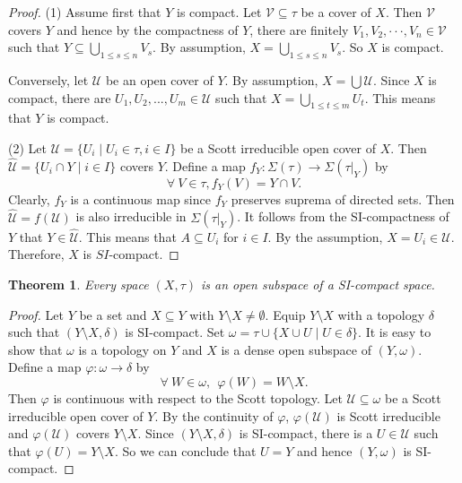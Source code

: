 \documentclass[preprint,12pt]{elsarticle}
\numberwithin{equation}{section}
\newtheorem{theorem}{Theorem}[section]
\begin{document}
\begin{proof}(1) Assume first that $Y$ is compact. Let $\mathcal{V}\subseteq\tau$ be a cover of $X$. Then $\mathcal{V}$ covers $Y$ and hence by the compactness of $Y$, there are finitely $V_{1},V_{2},\cdot\cdot\cdot, V_{n}\in\mathcal{V}$ such that $Y\subseteq\bigcup\limits_{1\leq s\leq n} V_{s}$. By assumption, $X=\bigcup\limits_{1\leq s\leq n} V_{s}$. So $X$ is compact.

Conversely, let $\mathcal{U}$ be an open cover of $Y$. By assumption, $X=\bigcup\mathcal{U}$. Since $X$ is compact, there are $U_{1},U_{2},...,U_{m}\in\mathcal{U}$ such that $X=\bigcup\limits_{1\leq t\leq m}U_{t}$. This means that $Y$ is compact.

(2) Let $\mathcal{U}=\{U_{i}\mid U_{i}\in\tau, i\in I\}$ be a Scott irreducible open cover of $X$. Then $\hat{\mathcal{U}}=\{U_{i}\cap Y\mid i\in I\}$ covers $Y$.  Define a map $f_{Y}:\Sigma(\tau)\longrightarrow\Sigma(\tau|_{Y})$ by
$$\forall\ V\in\tau, f_{Y}(V)=Y\cap V.$$
Clearly, $f_{Y}$ is a continuous map since $f_{Y}$ preserves suprema of directed sets. Then $\hat{\mathcal{U}}=f(\mathcal{U})$ is also irreducible in $\Sigma(\tau|_{Y})$. It follows from the SI-compactness of $Y$ that $Y\in\hat{\mathcal{U}}$. This means that $A\subseteq U_{i}$ for $i\in I$. By the assumption, $X=U_{i}\in\mathcal{U}$. Therefore, $X$ is $SI$-compact.\end{proof}



\begin{theorem} Every space $(X,\tau)$ is an open subspace of a SI-compact space.
\end{theorem}
\begin{proof}Let $Y$ be a set and $X\subseteq Y$ with $Y\setminus X\neq\emptyset$. Equip $Y\setminus X$ with a topology $\delta$ such that $(Y\setminus X,\delta)$ is SI-compact. Set $\omega=\tau\cup\{X\cup U\mid U\in\delta\}$. It is easy to show that $\omega$ is a topology on $Y$ and $X$ is a dense open subspace of $(Y,\omega)$. Define a map $\varphi:\omega\longrightarrow\delta$ by
$$ \forall \ W\in \omega,\ \ \varphi(W)=W\setminus X.$$
Then $\varphi$ is continuous with respect to the Scott topology. Let $\mathcal{U}\subseteq\omega$ be a Scott irreducible open cover of $Y$. By the continuity of $\varphi$, $\varphi(\mathcal{U})$ is Scott irreducible and $\varphi(\mathcal{U})$ covers $Y\setminus X$. Since  $(Y\setminus X,\delta)$ is SI-compact, there is a $U\in\mathcal{U}$ such that $\varphi(U)=Y\setminus X$. So we can conclude that $U=Y$ and hence $(Y,\omega)$ is SI-compact.\end{proof}
\end{document}

